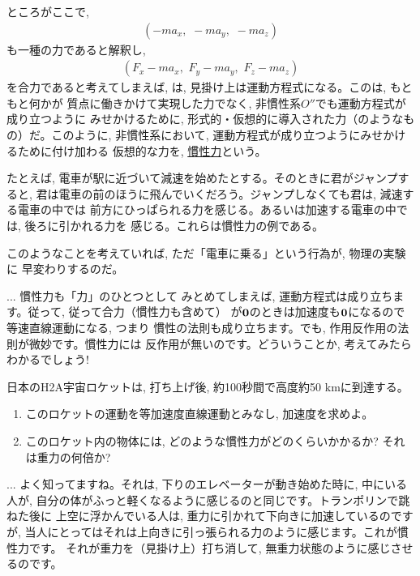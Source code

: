 ところがここで, 
\begin{eqnarray}(-ma_x,\,\, -ma_y,\,\, -ma_z)\label{eq:inert_force_3D}\end{eqnarray}
も一種の力であると解釈し, 
\begin{eqnarray}(F_x-ma_x,\,\, F_y-ma_y,\,\, F_z-ma_z)\end{eqnarray}
を合力であると考えてしまえば, は, 
見掛け上は運動方程式になる。このは, もともと何かが
質点に働きかけて実現した力でなく, 非慣性系$O''$でも運動方程式が成り立つように
みせかけるために, 形式的・仮想的に導入された力（のようなもの）だ。このように, 
非慣性系において, 運動方程式が成り立つようにみせかけるために付け加わる
仮想的な力を, \underline{慣性力}という。

たとえば, 電車が駅に近づいて減速を始めたとする。そのときに君がジャンプすると, 
君は電車の前のほうに飛んでいくだろう。ジャンプしなくても君は, 減速する電車の中では
前方にひっぱられる力を感じる。あるいは加速する電車の中では, 後ろに引かれる力を
感じる。これらは慣性力の例である。

このようなことを考えていれば, ただ「電車に乗る」という行為が, 物理の実験に
早変わりするのだ。

\begin{faq}{\small{} ... 慣性力も「力」のひとつとして
みとめてしまえば, 運動方程式は成り立ちます。従って, 従って合力（慣性力も含めて）
が${\bf 0}$のときは加速度も${\bf 0}$になるので等速直線運動になる, つまり
慣性の法則も成り立ちます。でも, 作用反作用の法則が微妙です。慣性力には
反作用が無いのです。どういうことか, 考えてみたらわかるでしょう!}\end{faq}

\begin{q}\label{q:inert_frame_H2}
日本のH2A宇宙ロケットは, 打ち上げ後, 約100秒間で高度約50 kmに到達する。
\begin{enumerate}
\item このロケットの運動を等加速度直線運動とみなし, 加速度を求めよ。
\item このロケット内の物体には, どのような慣性力がどのくらいかかるか? それは重力の何倍か? 
\end{enumerate}
\end{q}
\mv

\begin{faq}{\small{} ... 
よく知ってますね。それは, 下りのエレベーターが動き始めた時に, 中にいる人が, 
自分の体がふっと軽くなるように感じるのと同じです。トランポリンで跳ねた後に
上空に浮かんでいる人は, 重力に引かれて下向きに加速しているのですが, 
当人にとってはそれは上向きに引っ張られる力のように感じます。これが慣性力です。
それが重力を（見掛け上）打ち消して, 無重力状態のように感じさせるのです。
}\end{faq}\mv

